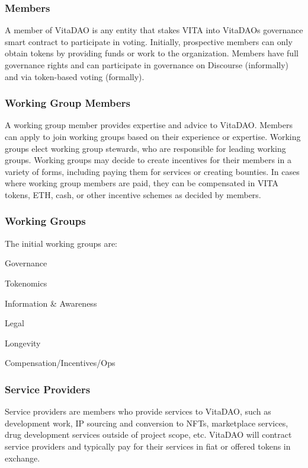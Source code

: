 \documentclass[10pt,letterpaper]{article}
\newenvironment{tight_enumerate}{
\begin{enumerate}
  \setlength{\itemsep}{0pt}
  \setlength{\parskip}{0pt}
}{\end{enumerate}}
\begin{document}
\subsubsection{Members}
A member of VitaDAO is any entity that stakes VITA into VitaDAOs governance smart contract to participate in voting. Initially, prospective members can only obtain tokens by providing funds or work to the organization. Members have full governance rights and can participate in governance on Discourse (informally) and via token-based voting (formally).

\subsubsection{Working Group Members}
A working group member provides expertise and advice to VitaDAO. Members can apply to join working groups based on their experience or expertise. Working groups elect working group stewards, who are responsible for leading working groups. Working groups may decide to create incentives for their members in a variety of forms, including paying them for services or creating bounties. In cases where working group members are paid, they can be compensated in VITA tokens, ETH, cash, or other incentive schemes as decided by members.

\subsubsection{Working Groups}

The initial working groups are: 
\begin{tight_enumerate}
\item Governance
\item Tokenomics
\item Information \& Awareness
\item Legal
\item Longevity
\item Compensation/Incentives/Ops
\end{tight_enumerate}

\subsubsection{Service Providers}
Service providers are members who provide services to VitaDAO, such as development work, IP sourcing and conversion to NFTs, marketplace services, drug development services outside of project scope, etc. VitaDAO will contract service providers and typically pay for their services in fiat or offered tokens in exchange.
\end{document}
